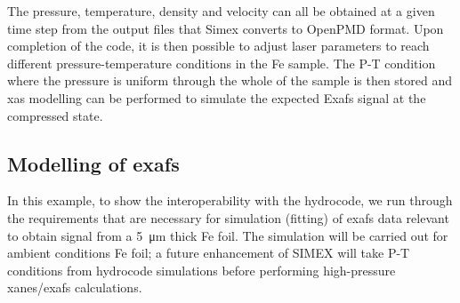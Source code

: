  The pressure, temperature, density and velocity can all be obtained at a given
 time step from the output files that Simex converts to OpenPMD \cite{Huebl2017} format. Upon
 completion of the code, it is then possible to adjust laser parameters to reach
 different pressure-temperature conditions in the Fe sample. The P-T condition
 where the pressure is uniform through the whole of the sample is then stored and
 \gls{xas} modelling can be performed to simulate the expected E\gls{xafs} signal at
 the compressed state.
%
 \begin{figure}
 \end{figure}
%
 \subsection{Modelling of \gls{exafs}}
In this example, to show the interoperability with the hydrocode,
we run through the requirements that are necessary for
simulation (fitting) of \gls{exafs} data relevant to obtain signal
from a \SI{5}{\micro\metre} thick Fe foil. The simulation will be carried out for
ambient conditions Fe foil; a future enhancement of SIMEX will take P-T
conditions from hydrocode simulations before performing high-pressure
\gls{xanes}/\gls{exafs} calculations.

